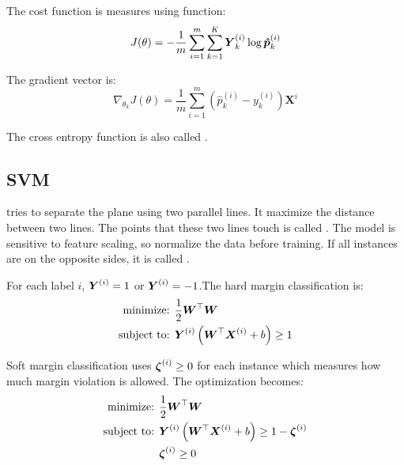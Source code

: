 The cost function is measures using  function:
\begin{equation}
	J(\theta)= -\frac{1}{m} \sum_{i=1}^m \sum_{k=1}^K \boldsymbol{Y}^{(i)}_k \log \boldsymbol{\hat{p}}^{(i)}_k
\end{equation}


The gradient vector is:
\begin{equation}
	\nabla_{\theta_k} J(\theta) = \frac{1}{m} \sum_{i=1}^m(\hat{p}_k^{(i)} - y_k^{(i)}) \mathbf{X}^i
\end{equation}


The cross entropy function is also called .


\subsection{SVM}

 tries to separate the plane using two parallel lines. It maximize the distance between two lines. The points that these two lines touch is called . The model is sensitive to feature scaling, so normalize the data before training. If all instances are on the opposite sides, it is called .


For each label $i$, $\boldsymbol{Y}^{(i)} =1$ or $\boldsymbol{Y}^{(i)} =-1$.The hard margin classification is:
\begin{equation}
    \begin{aligned}
        \text{minimize: } & \frac{1}{2} \boldsymbol{W}^\top \boldsymbol{W} \\
        \text{subject to: } & \boldsymbol{Y}^{(i)} \left( \boldsymbol{W}^\top \boldsymbol{X}^{(i)} + b \right) \geq 1
    \end{aligned}
\end{equation}

Soft margin classification uses  $\boldsymbol{\zeta}^{(i)} \geq 0$ for each instance which measures how much margin violation is allowed. The optimization becomes:
\begin{equation}
    \begin{aligned}
        \text{minimize: } & \frac{1}{2} \boldsymbol{W}^\top \boldsymbol{W} \\
        \text{subject to: } & \boldsymbol{Y}^{(i)} \left( \boldsymbol{W}^\top \boldsymbol{X}^{(i)} + b \right) \geq 1 - \boldsymbol{\zeta}^{(i)} \\
        & \boldsymbol{\zeta}^{(i)} \geq 0
    \end{aligned}
\end{equation}


